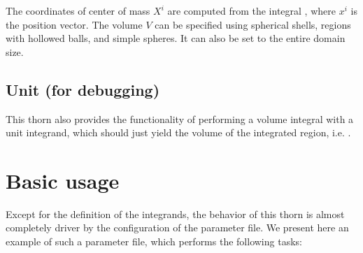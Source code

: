 The coordinates of center of mass $X^{i}$ are computed from the integral
\beq
{}\; ,
\eeq
where $x^{i}$ is the position vector. The volume $V$ can be specified using spherical shells,
regions with hollowed balls, and simple spheres. It can also be set to the entire domain size.

\subsection{Unit (for debugging)}
\label{sec:unit}

This thorn also provides the functionality of performing a volume
integral with a unit integrand, which should just yield the volume
of the integrated region, i.e.
\beq
{}\; .
\eeq

\section{Basic usage}
\label{sec:basic_usage}

Except for the definition of the integrands, the behavior of this thorn
is almost completely driver by the configuration of the parameter file.
We present here an example of such a parameter file, which performs the
following tasks:

